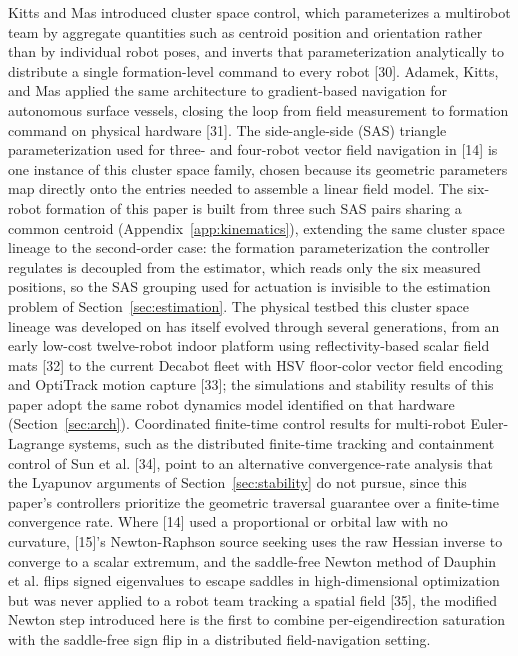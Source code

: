 \documentclass[lettersize,journal]{IEEEtran}
\begin{document}
Kitts and Mas introduced cluster space control, which parameterizes a
multirobot team by aggregate quantities such as centroid position and
orientation rather than by individual robot poses, and inverts that
parameterization analytically to distribute a single formation-level
command to every robot [30]. Adamek, Kitts, and Mas applied the same
architecture to gradient-based navigation for autonomous surface vessels,
closing the loop from field measurement to formation command on physical
hardware [31]. The side-angle-side (SAS) triangle parameterization used for
three- and four-robot vector field navigation in [14] is one instance of
this cluster space family, chosen because its geometric parameters map
directly onto the entries needed to assemble a linear field model. The
six-robot formation of this paper is built from three such SAS pairs
sharing a common centroid (Appendix~\ref{app:kinematics}), extending the
same cluster space lineage to the second-order case: the formation
parameterization the controller regulates is decoupled from the estimator,
which reads only the six measured positions, so the SAS grouping used for
actuation is invisible to the estimation problem of
Section~\ref{sec:estimation}. The physical testbed this cluster space
lineage was developed on has itself evolved through several
generations, from an early low-cost twelve-robot indoor platform using
reflectivity-based scalar field mats [32] to the current Decabot fleet
with HSV floor-color vector field encoding and OptiTrack motion capture
[33]; the simulations and stability results of this paper adopt the same
robot dynamics model identified on that hardware
(Section~\ref{sec:arch}). Coordinated finite-time control results for
multi-robot Euler-Lagrange systems, such as the distributed
finite-time tracking and containment control of Sun et al. [34], point
to an alternative convergence-rate analysis that the Lyapunov arguments
of Section~\ref{sec:stability} do not pursue, since this paper's
controllers prioritize the geometric traversal guarantee over a
finite-time convergence rate. Where [14] used a proportional or orbital law
with no curvature, [15]'s Newton-Raphson source seeking uses the raw
Hessian inverse to converge to a scalar extremum, and the saddle-free
Newton method of Dauphin et al. flips signed eigenvalues to escape saddles
in high-dimensional optimization but was never applied to a robot team
tracking a spatial field [35], the modified Newton step introduced here is
the first to combine per-eigendirection saturation with the saddle-free
sign flip in a distributed field-navigation setting.
\end{document}
